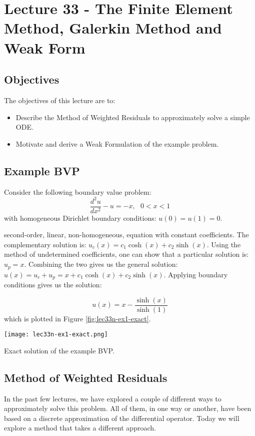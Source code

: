 \chapter{Lecture 33 - The Finite Element Method, Galerkin Method and Weak Form}
\label{ch:lec33n}
\section{Objectives}
The objectives of this lecture are to:
\begin{itemize}
\item Describe the Method of Weighted Residuals to approximately solve a simple ODE.
\item Motivate and derive a Weak Formulation of the example problem.
\end{itemize}
\setcounter{lstannotation}{0}

\section{Example BVP}
Consider the following boundary value problem:
\begin{equation*}
\frac{d^2u}{dx^2}-u = -x, \ \ \ 0 < x < 1 
\end{equation*}
with homogeneous Dirichlet boundary conditions: $u(0)=u(1) = 0$.

 second-order, linear, non-homogeneous, equation with constant coefficients.  The complementary solution is: $u_c(x) = c_1\cosh{(x)}+c_2\sinh{(x)}$.  Using the method of undetermined coefficients, one can show that a particular solution is: $u_p = x$.  Combining the two gives us the general solution: $u(x) = u_c + u_p = x + c_1\cosh{(x)}+c_2\sinh{(x)}$. Applying boundary conditions gives us the solution:

\begin{equation}
u(x) = x - \frac{\sinh{(x)}}{\sinh{(1)}}
\label{eq:lec33n-ex-analytic}
\end{equation}
which is plotted in Figure \ref{fig:lec33n-ex1-exact}.
\begin{marginfigure}
\texttt{[image: lec33n-ex1-exact.png]}
\caption{Exact solution of the example BVP.}
\label{fig:lec33n-ex1-exact}
\end{marginfigure}

\section{Method of Weighted Residuals}
In the past few lectures, we have explored a couple of different ways to approximately solve this problem.  All of them, in one way or another, have been based on a discrete approximation of the differential operator.  Today we will explore a method that takes a different approach.

